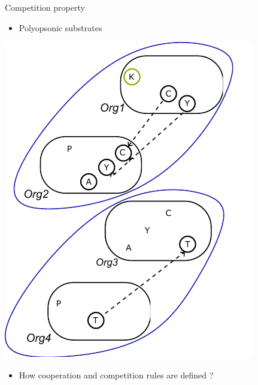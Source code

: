 \documentclass[8pt,usenames,dvipsnames]{beamer}
\begin{document}
\begin{frame}
{\begin{minipage}{0.4\textwidth}
\begin{block}{Competition property}
\begin{itemize}
\item Polyopsonic substrates
\end{itemize}
\end{block}
\end{minipage}%
\hspace{0.5cm}
\hfill
\begin{minipage}{0.45\textwidth}
\includegraphics[width=\textwidth]{figures/properties-3.pdf}
\end{minipage}

\begin{block}{}
\begin{itemize}
\item How cooperation and competition rules are defined ?
\end{itemize}
\end{block}

}


\end{frame}
\end{document}
